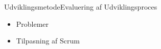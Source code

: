 \begin{frame}{Udviklingsmetode}{Evaluering af Udviklingsproces}
	
	\begin{itemize}
		\item Problemer
		\item Tilpasning af Scrum
	\end{itemize}
	
\end{frame}